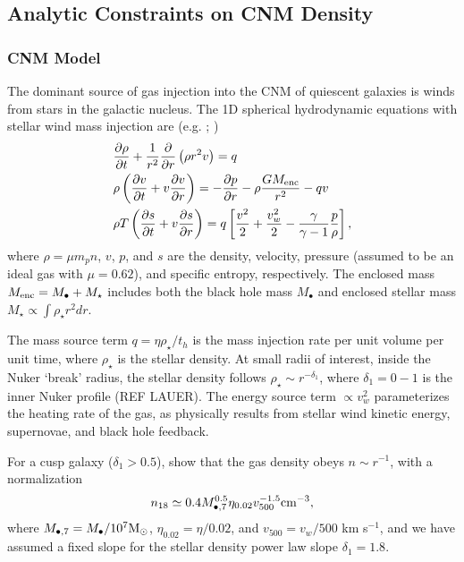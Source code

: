 \documentclass[usenatbib,fleqn]{mnras}
\newcommand{\Mbh}[1][]{M_{\bullet#1}}
\newcommand{\Menc}{M_{\rm enc}}
\renewcommand{\th}{t_h}
\newcommand{\Msun}{{\rm M_\odot}}
\begin{document}
\subsection{Analytic Constraints on CNM Density}

\subsubsection{CNM Model}

The dominant source of gas injection into the CNM of quiescent
galaxies is winds from stars in the galactic nucleus. The 1D spherical
hydrodynamic equations with stellar wind mass injection are
(e.g. \citealt{Holzer+1970}; \citealt{Quataert04}) 
\begin{align}
  &\frac{\partial \rho}{\partial t}+\frac{1}{r^2}\frac{\partial}{\partial r}\left(\rho r^2 v\right)=q \label{eq:drhodt}\\
  &\rho \left(\frac{\partial v}{\partial t} + v\frac{\partial
      v}{\partial r}\right) =-\frac{\partial p}{\partial r}- \rho\frac{GM_{\rm enc}}{r^{2}} -q v \label{eq:dvdt}\\
  &\rho T\left(\frac{\partial s}{\partial t} + v\frac{\partial
      s}{\partial
      r}\right)=q\left[\frac{v^2}{2}+\frac{v_w^2}{2}-\frac{\gamma}{\gamma-1}
    \frac{p}{\rho} \right] ,
\label{eq:dsdt}
\end{align}
where $\rho = \mu m_p n$, $v$, $p$, and $s$ are the density, velocity, pressure (assumed to be an ideal gas with $\mu = 0.62$), and
specific entropy, respectively.  The enclosed mass $\Menc = M_{\bullet} + M_{\star}$ includes both the black hole mass $M_{\bullet}$ and enclosed stellar mass $M_{\star} \propto \int \rho_{\star}r^{2}dr$.  

The mass source term $q =\eta \rho_\star/\th$ is the mass injection rate per unit volume per unit time, where $\rho_\star$ is the stellar density.  At small radii of interest, inside the Nuker `break' radius, the stellar density follows $\rho_\star\sim r^{-\delta_1}$, where $\delta_1 = 0-1$ is the inner Nuker profile (REF LAUER).  The energy source term $\propto v_w^{2}$ parameterizes the heating rate of the gas, as physically results from stellar wind kinetic energy, supernovae, and black hole feedback.  

For a cusp galaxy ($\delta_1> 0.5$), \citet{Generozov+2015} show that the gas density obeys $n \sim
r^{-1}$, with a normalization
\begin{equation}
n_{18}\simeq 0.4 \Mbh[,7]^{0.5} \eta_{0.02} v_{500}^{-1.5} {\rm
  cm^{-3}},
\label{eq:n18}
\end{equation}
where $\Mbh[,7]= \Mbh/10^7 \Msun$,
$\eta_{0.02}= \eta/0.02$, and $v_{500}=v_w/500$ km s$^{-1}$, and we have assumed a fixed slope for the stellar density
power law slope $\delta_1=1.8$. 
\end{document}
